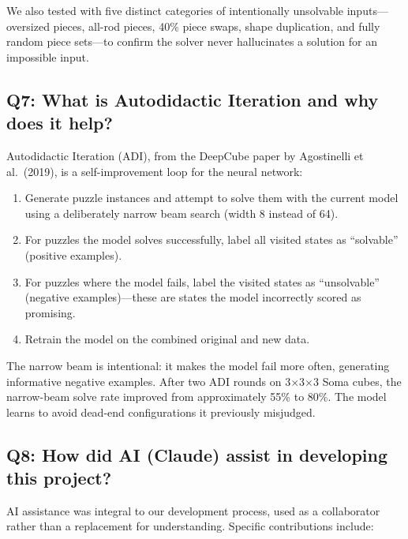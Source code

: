 \documentclass[11pt]{article}
\begin{document}
We also tested with five distinct categories of intentionally unsolvable inputs---oversized pieces, all-rod pieces, 40\% piece swaps, shape duplication, and fully random piece sets---to confirm the solver never hallucinates a solution for an impossible input.

\subsection*{Q7: What is Autodidactic Iteration and why does it help?}

Autodidactic Iteration (ADI), from the DeepCube paper by Agostinelli et al.\ (2019), is a self-improvement loop for the neural network:

\begin{enumerate}[nosep]
  \item Generate puzzle instances and attempt to solve them with the current model using a deliberately narrow beam search (width 8 instead of 64).
  \item For puzzles the model solves successfully, label all visited states as ``solvable'' (positive examples).
  \item For puzzles where the model fails, label the visited states as ``unsolvable'' (negative examples)---these are states the model incorrectly scored as promising.
  \item Retrain the model on the combined original and new data.
\end{enumerate}

The narrow beam is intentional: it makes the model fail more often, generating informative negative examples. After two ADI rounds on 3$\times$3$\times$3 Soma cubes, the narrow-beam solve rate improved from approximately 55\% to 80\%. The model learns to avoid dead-end configurations it previously misjudged.

\subsection*{Q8: How did AI (Claude) assist in developing this project?}

AI assistance was integral to our development process, used as a collaborator rather than a replacement for understanding. Specific contributions include:
\end{document}
